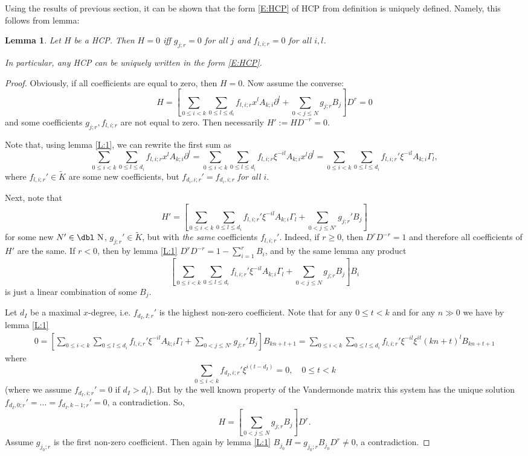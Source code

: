 \documentclass[11pt]{article}
\theoremstyle{definition}
\newcommand{\dn}{{\mbox{\dbl N}}}
\theoremstyle{plain}
\newtheorem{lemma}{Lemma}[section]
\numberwithin{equation}{section}
\begin{document}
Using the results of previous section, it can be shown that the form \eqref{E:HCP} of HCP from definition is uniquely defined. Namely, this follows from lemma:

\begin{lemma}
\label{L:correct_HPC}
Let $H$ be a HCP. Then $H=0$ iff $g_{j;r}=0$ for all $j$ and $f_{l,i;r}=0$ for all $i,l$. 

In particular, any HCP can be uniquely written in the form \eqref{E:HCP}.
\end{lemma}

\begin{proof}
Obviously, if all coefficients are equal to zero, then $H=0$. Now assume the converse:
$$
H=[\sum_{0\leq i<k}\sum_{0\leq l\leq d_{i}}f_{l,i;r}x^l A_{k;i}\partial^l+\sum_{0<j\leq N}g_{j;r}B_{j}]D^{r} =0
$$
and some coefficients $g_{j;r}, f_{l,i;r}$ are not equal to zero. Then necessarily $H':=H D^{-r}=0$.

Note that, using lemma \ref{L:1}, we can rewrite the first sum as
$$
\sum_{0\leq i<k}\sum_{0\leq l\leq d_{i}}f_{l,i;r}x^l A_{k;i}\partial^l=\sum_{0\leq i<k}\sum_{0\leq l\leq d_{i}}f_{l,i;r} \xi^{-il} A_{k;i} x^l \partial^l =\sum_{0\leq i<k}\sum_{0\leq l\leq d_{i}}f_{l,i;r}' \xi^{-il} A_{k;i} \Gamma_l, 
$$
where $f_{l,i;r}'\in \tilde{K}$ are some new coefficients, but $f_{d_i,i;r}'=f_{d_i,i;r}$ {\it for all $i$}. 

Next, note that 
$$
H'=[\sum_{0\leq i<k}\sum_{0\leq l\leq d_{i}}f_{l,i;r}' \xi^{-il} A_{k;i} \Gamma_l+\sum_{0<j\leq N'}g_{j;r}'B_{j}] 
$$
for some new $N'\in \dn$, $g_{j;r}'\in \tilde{K}$, but with {\it the same} coefficients $f_{l,i;r}'$. 
Indeed, if $r\ge 0$, then $D^r D^{-r}=1$ and therefore all coefficients of $H'$ are the same. If $r<0$, then by lemma \ref{L:1} $D^r D^{-r}=1-\sum_{i=1}^rB_i$, and by the same lemma any product 
$$
[\sum_{0\leq i<k}\sum_{0\leq l\leq d_{i}}f_{l,i;r}' \xi^{-il} A_{k;i} \Gamma_l+\sum_{0<j\leq N}g_{j;r}B_{j}]B_i
$$
is just a linear combination of some $B_j$. 

Let $d_{I}$ be a maximal $x$-degree, i.e. $f_{d_I,I;r}'$ is the highest non-zero coefficient. Note that for any $0\le t<k$ and for any $n\gg 0$ we have by lemma \ref{L:1}
\begin{multline*}
0=[\sum_{0\leq i<k}\sum_{0\leq l\leq d_{i}}f_{l,i;r}' \xi^{-il} A_{k;i} \Gamma_l+\sum_{0<j\leq N'}g_{j;r}'B_{j}]B_{kn+t+1}=
\sum_{0\leq i<k}\sum_{0\leq l\leq d_{i}} f_{l,i;r}' \xi^{-il} \xi^{it} (kn+t)^l B_{kn+t+1}
\end{multline*}
where
$$
\sum_{0\leq i<k}  f_{d_I,i;r}' \xi^{i(t-d_I)}=0, \quad 0\le t<k
$$
(where we assume $f_{d_I,i;r}'=0$ if $d_I>d_i$). But by the well known property of the Vandermonde matrix this system has the unique solution $f_{d_I,0;r}'=\ldots =f_{d_I,k-1;r}'=0$, a contradiction. So, 
$$
H=[\sum_{0<j\leq N}g_{j;r}B_{j}]D^{r}.
$$
Assume $g_{j_0;r}$ is the first non-zero coefficient. Then again by lemma \ref{L:1} $B_{j_0}H= g_{j_0;r}B_{j_0}D^{r}\neq 0$, a contradiction. 
\end{proof}
\end{document}
